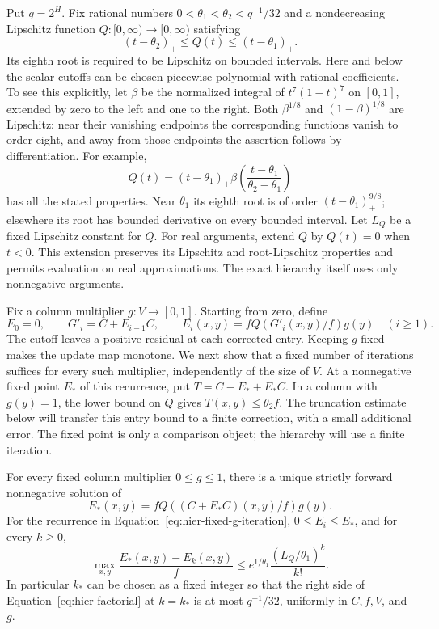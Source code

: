 Put $q=2^H$.  Fix rational numbers
$0<\theta_1<\theta_2<q^{-1}/32$ and a nondecreasing Lipschitz function
$Q:[0,\infty)\to[0,\infty)$ satisfying
\begin{equation}
 (t-\theta_2)_+\leq Q(t)\leq(t-\theta_1)_+.
 \label{eq:hier-Q}
\end{equation}
Its eighth root is required to be Lipschitz on bounded intervals.
Here and below the scalar cutoffs can be chosen piecewise polynomial with
rational coefficients.  To see this explicitly, let $\beta$ be the
normalized integral of $t^7(1-t)^7$ on $[0,1]$, extended by zero to the
left and one to the right.  Both $\beta^{1/8}$ and
$(1-\beta)^{1/8}$ are Lipschitz: near their vanishing endpoints the
corresponding functions vanish to order eight, and away from those
endpoints the assertion follows by differentiation.  For example,
\[
 Q(t)=(t-\theta_1)_+
       \beta\left(\frac{t-\theta_1}{\theta_2-\theta_1}\right)
\]
has all the stated properties.  Near $\theta_1$ its eighth root is of
order $(t-\theta_1)_+^{9/8}$; elsewhere its root has bounded derivative
on every bounded interval.  Let $L_Q$ be a fixed Lipschitz constant for
$Q$.  For real arguments, extend $Q$ by $Q(t)=0$ when $t<0$.
This extension preserves its Lipschitz and root-Lipschitz properties and
permits evaluation on real approximations.  The exact hierarchy itself
uses only nonnegative arguments.

Fix a column multiplier $g:V\to[0,1]$.  Starting from zero, define
\begin{equation}
 E_0=0,\qquad G'_i=C+E_{i-1}C,\qquad
 E_i(x,y)=fQ(G'_i(x,y)/f)g(y)\quad(i\ge1).
 \label{eq:hier-fixed-g-iteration}
\end{equation}
The cutoff leaves a positive residual at each corrected entry.  Keeping
$g$ fixed makes the update map monotone.  We next show that a fixed
number of iterations suffices for every such multiplier, independently
of the size of $V$.  At a nonnegative fixed point $E_*$ of this recurrence, put
$T=C-E_*+E_*C$.  In a column with $g(y)=1$, the lower bound on $Q$
gives $T(x,y)\le\theta_2f$.  The truncation estimate below will transfer
this entry bound to a finite correction, with a small additional error.
The fixed point is only a comparison object; the hierarchy will use a
finite iteration.

\begin{lemma}
\label{lem:hier-fixed-point}
For every fixed column multiplier $0\leq g\leq1$, there is a unique
strictly forward nonnegative solution of
\begin{equation}
 E_*(x,y)=fQ((C+E_*C)(x,y)/f)g(y).
 \label{eq:hier-fixed-point}
\end{equation}
For the recurrence in Equation~\eqref{eq:hier-fixed-g-iteration}, $0\leq E_i\leq E_*$, and for every $k\geq0$,
\begin{equation}
 \max_{x,y}\frac{E_*(x,y)-E_k(x,y)}f
 \leq
 e^{1/\theta_1}\frac{(L_Q/\theta_1)^k}{k!}.
 \label{eq:hier-factorial}
\end{equation}
In particular $k_*$ can be chosen as a fixed integer so that the
right side of Equation~\eqref{eq:hier-factorial} at $k=k_*$ is at most
$q^{-1}/32$, uniformly in $C,f,V$, and $g$.
\end{lemma}

